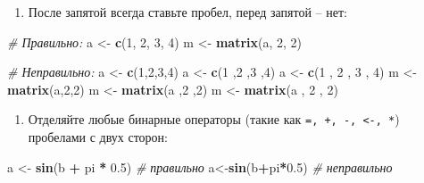 \documentclass[]{book}
\newenvironment{Shaded}{\begin{snugshade}}{\end{snugshade}}
\newcommand{\KeywordTok}[1]{\textcolor[rgb]{0.13,0.29,0.53}{\textbf{#1}}}
\newcommand{\DecValTok}[1]{\textcolor[rgb]{0.00,0.00,0.81}{#1}}
\newcommand{\FloatTok}[1]{\textcolor[rgb]{0.00,0.00,0.81}{#1}}
\newcommand{\StringTok}[1]{\textcolor[rgb]{0.31,0.60,0.02}{#1}}
\newcommand{\CommentTok}[1]{\textcolor[rgb]{0.56,0.35,0.01}{\textit{#1}}}
\newcommand{\OperatorTok}[1]{\textcolor[rgb]{0.81,0.36,0.00}{\textbf{#1}}}
\newcommand{\NormalTok}[1]{#1}
\providecommand{\tightlist}{%
  \setlength{\itemsep}{0pt}\setlength{\parskip}{0pt}}
\begin{document}
\begin{enumerate}
\def\labelenumi{\arabic{enumi}.}
\setcounter{enumi}{1}
\tightlist
\item
  После запятой всегда ставьте пробел, перед запятой -- нет:
\end{enumerate}

\begin{Shaded}
\begin{Highlighting}[]
\CommentTok{# Правильно:}
\NormalTok{a <-}\StringTok{ }\KeywordTok{c}\NormalTok{(}\DecValTok{1}\NormalTok{, }\DecValTok{2}\NormalTok{, }\DecValTok{3}\NormalTok{, }\DecValTok{4}\NormalTok{)}
\NormalTok{m <-}\StringTok{ }\KeywordTok{matrix}\NormalTok{(a, }\DecValTok{2}\NormalTok{, }\DecValTok{2}\NormalTok{)}

\CommentTok{# Неправильно:}
\NormalTok{a <-}\StringTok{ }\KeywordTok{c}\NormalTok{(}\DecValTok{1}\NormalTok{,}\DecValTok{2}\NormalTok{,}\DecValTok{3}\NormalTok{,}\DecValTok{4}\NormalTok{)}
\NormalTok{a <-}\StringTok{ }\KeywordTok{c}\NormalTok{(}\DecValTok{1}\NormalTok{ ,}\DecValTok{2}\NormalTok{ ,}\DecValTok{3}\NormalTok{ ,}\DecValTok{4}\NormalTok{)}
\NormalTok{a <-}\StringTok{ }\KeywordTok{c}\NormalTok{(}\DecValTok{1}\NormalTok{ , }\DecValTok{2}\NormalTok{ , }\DecValTok{3}\NormalTok{ , }\DecValTok{4}\NormalTok{)}
\NormalTok{m <-}\StringTok{ }\KeywordTok{matrix}\NormalTok{(a,}\DecValTok{2}\NormalTok{,}\DecValTok{2}\NormalTok{)}
\NormalTok{m <-}\StringTok{ }\KeywordTok{matrix}\NormalTok{(a ,}\DecValTok{2}\NormalTok{ ,}\DecValTok{2}\NormalTok{)}
\NormalTok{m <-}\StringTok{ }\KeywordTok{matrix}\NormalTok{(a , }\DecValTok{2}\NormalTok{ , }\DecValTok{2}\NormalTok{)}
\end{Highlighting}
\end{Shaded}

\begin{enumerate}
\def\labelenumi{\arabic{enumi}.}
\setcounter{enumi}{2}
\tightlist
\item
  Отделяйте любые бинарные операторы (такие как
  \texttt{=,\ +,\ -,\ \textless{}-,\ *}) пробелами с двух сторон:
\end{enumerate}

\begin{Shaded}
\begin{Highlighting}[]
\NormalTok{a <-}\StringTok{ }\KeywordTok{sin}\NormalTok{(b }\OperatorTok{+}\StringTok{ }\NormalTok{pi }\OperatorTok{*}\StringTok{ }\FloatTok{0.5}\NormalTok{) }\CommentTok{# правильно}
\NormalTok{a<-}\KeywordTok{sin}\NormalTok{(b}\OperatorTok{+}\NormalTok{pi}\OperatorTok{*}\FloatTok{0.5}\NormalTok{) }\CommentTok{# неправильно}
\end{Highlighting}
\end{Shaded}
\end{document}

